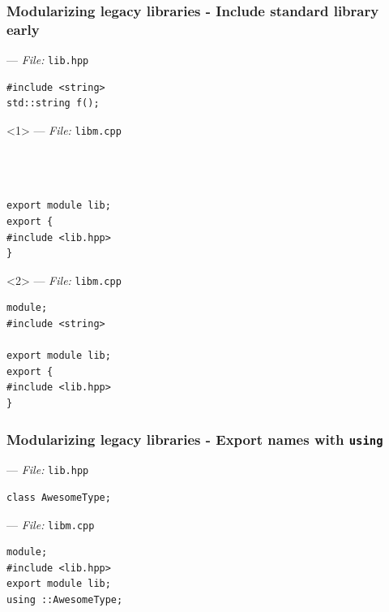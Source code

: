 \documentclass[aspectratio=169]{beamer}
\begin{document}
\begin{frame}[fragile]
  \frametitle{Modularizing legacy libraries - Include standard library early}
  --- \textit{File:} \texttt{lib.hpp}
  \begin{lstlisting}[style=cpp20]
#include <string>
std::string f();
  \end{lstlisting}

  \begin{onlyenv}<1>
  --- \textit{File:} \texttt{libm.cpp}
  \begin{lstlisting}[style=cpp20]



export module lib;
export {
#include <lib.hpp>
}
  \end{lstlisting}
  \end{onlyenv}

  \begin{onlyenv}<2>
  --- \textit{File:} \texttt{libm.cpp}
  \begin{lstlisting}[style=cpp20]
module;
#include <string>

export module lib;
export {
#include <lib.hpp>
}
  \end{lstlisting}
  \end{onlyenv}

\end{frame}

\begin{frame}[fragile]
  \frametitle{Modularizing legacy libraries - Export names with \texttt{using}}

  --- \textit{File:} \texttt{lib.hpp}
  \begin{lstlisting}[style=cpp20]
class AwesomeType;
  \end{lstlisting}
  --- \textit{File:} \texttt{libm.cpp}
  \begin{lstlisting}[style=cpp20]
module;
#include <lib.hpp>
export module lib;
using ::AwesomeType;
  \end{lstlisting}

\end{frame}
\end{document}

